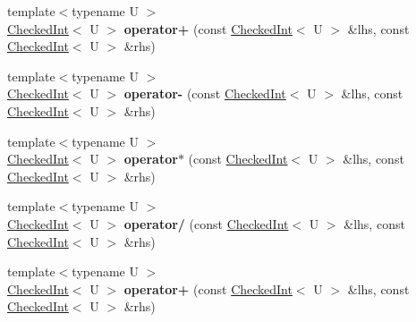 \begin{DoxyCompactItemize}
\item 
\hypertarget{classmozilla_1_1_checked_int_ad624d9ee3841056390d2f78695c54da7}{{\footnotesize template$<$typename U $>$ }\\\hyperlink{classmozilla_1_1_checked_int}{Checked\-Int}$<$ U $>$ {\bfseries operator+} (const \hyperlink{classmozilla_1_1_checked_int}{Checked\-Int}$<$ U $>$ \&lhs, const \hyperlink{classmozilla_1_1_checked_int}{Checked\-Int}$<$ U $>$ \&rhs)}\label{classmozilla_1_1_checked_int_ad624d9ee3841056390d2f78695c54da7}

\item 
\hypertarget{classmozilla_1_1_checked_int_aaa598c2ed27abd8fad5f65dff8c5c46b}{{\footnotesize template$<$typename U $>$ }\\\hyperlink{classmozilla_1_1_checked_int}{Checked\-Int}$<$ U $>$ {\bfseries operator-\/} (const \hyperlink{classmozilla_1_1_checked_int}{Checked\-Int}$<$ U $>$ \&lhs, const \hyperlink{classmozilla_1_1_checked_int}{Checked\-Int}$<$ U $>$ \&rhs)}\label{classmozilla_1_1_checked_int_aaa598c2ed27abd8fad5f65dff8c5c46b}

\item 
\hypertarget{classmozilla_1_1_checked_int_a94e1ed12e88299128402485ff53f236f}{{\footnotesize template$<$typename U $>$ }\\\hyperlink{classmozilla_1_1_checked_int}{Checked\-Int}$<$ U $>$ {\bfseries operator$\ast$} (const \hyperlink{classmozilla_1_1_checked_int}{Checked\-Int}$<$ U $>$ \&lhs, const \hyperlink{classmozilla_1_1_checked_int}{Checked\-Int}$<$ U $>$ \&rhs)}\label{classmozilla_1_1_checked_int_a94e1ed12e88299128402485ff53f236f}

\item 
\hypertarget{classmozilla_1_1_checked_int_af275f2e36d8227629d9520a0bdac26ca}{{\footnotesize template$<$typename U $>$ }\\\hyperlink{classmozilla_1_1_checked_int}{Checked\-Int}$<$ U $>$ {\bfseries operator/} (const \hyperlink{classmozilla_1_1_checked_int}{Checked\-Int}$<$ U $>$ \&lhs, const \hyperlink{classmozilla_1_1_checked_int}{Checked\-Int}$<$ U $>$ \&rhs)}\label{classmozilla_1_1_checked_int_af275f2e36d8227629d9520a0bdac26ca}

\item 
\hypertarget{classmozilla_1_1_checked_int_ad624d9ee3841056390d2f78695c54da7}{{\footnotesize template$<$typename U $>$ }\\\hyperlink{classmozilla_1_1_checked_int}{Checked\-Int}$<$ U $>$ {\bfseries operator+} (const \hyperlink{classmozilla_1_1_checked_int}{Checked\-Int}$<$ U $>$ \&lhs, const \hyperlink{classmozilla_1_1_checked_int}{Checked\-Int}$<$ U $>$ \&rhs)}\label{classmozilla_1_1_checked_int_ad624d9ee3841056390d2f78695c54da7}


\end{DoxyCompactItemize}
